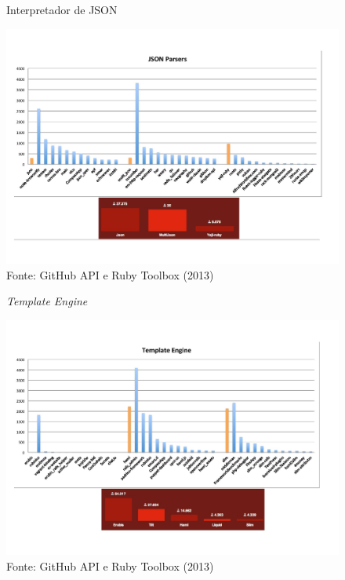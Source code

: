 \begin{figure}[ht]
	\centering
    \caption{Interpretador de JSON}
    \includegraphics[width=15cm]{Imagens/gems-5.jpg}
	\caption*{Fonte: GitHub API e Ruby Toolbox (2013)}
\end{figure}
\begin{figure}[ht]
	\centering
    \caption{\textit{Template Engine}}
    \includegraphics[width=15cm]{Imagens/gems-6.jpg}
	\caption*{Fonte: GitHub API e Ruby Toolbox (2013)}
\end{figure}